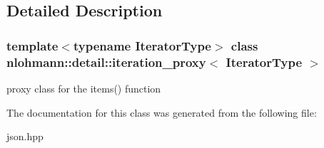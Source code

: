 \subsection{Detailed Description}
\subsubsection*{template$<$typename Iterator\+Type$>$\newline
class nlohmann\+::detail\+::iteration\+\_\+proxy$<$ Iterator\+Type $>$}

proxy class for the items() function 

The documentation for this class was generated from the following file\+:\begin{DoxyCompactItemize}
\item 
json.\+hpp\end{DoxyCompactItemize}
